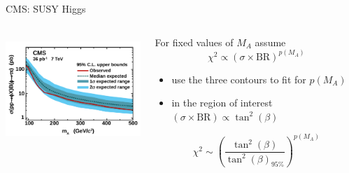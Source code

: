 \documentclass{beamer}
\begin{document}
\begin{frame}{CMS: SUSY Higgs}
  \begin{columns}
    \begin{column}{0.5\textwidth}
      \includegraphics[height=4cm]{htt95.pdf}
      \vfill
    \end{column}

    \begin{column}{0.5\textwidth}
      For fixed values of $M_{A}$ assume
      \begin{equation*}
        \chi^{2}\propto\left(\sigma\times\textrm{BR}\right)^{p\left(M_{A}\right)}
      \end{equation*}
      \begin{itemize}
        \item use the three contours to fit for $p\left(M_{A}\right)$
        \item in the region of interest
        $\left(\sigma\times\textrm{BR}\right)\propto\tan^{2}\left(\beta\right)$
      \end{itemize}
      \begin{equation*}
        \chi^{2}\sim\left(\frac{\tan^{2}\left(\beta\right)}{\tan^{2}\left(\beta\right)_{95\%}}\right)^{p\left(M_{A}\right)}
      \end{equation*}
    \end{column}
  \end{columns}
\end{frame}
\end{document}
